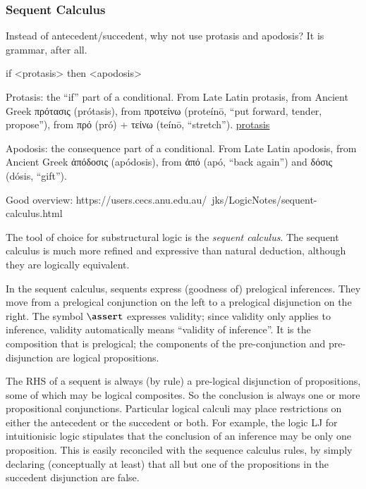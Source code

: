 \documentclass{article}
\begin{document}

\subsubsection{Sequent Calculus}

Instead of antecedent/succedent, why not use protasis and apodosis? It
is grammar, after all.

if <protasis> then <apodosis>

Protasis: the ``if'' part of a conditional. From Late Latin protasis,
from Ancient Greek πρότασις (prótasis), from προτείνω (proteínō, “put
forward, tender, propose”), from πρό (pró) + τείνω (teínō, “stretch”).
\href{https://en.wiktionary.org/wiki/protasis}{protasis}

Apodosis: the consequence part of a conditional. From Late Latin
apodosis, from Ancient Greek ἀπόδοσις (apódosis), from ἀπό (apó, “back
again”) and δόσις (dósis, “gift”).

Good overview:
https://users.cecs.anu.edu.au/~jks/LogicNotes/sequent-calculus.html


The tool of choice for substructural logic is the \textit{sequent
  calculus}. The sequent calculus is much more refined and expressive
than natural deduction, although they are logically equivalent.

In the sequent calculus, sequents express (goodness of) prelogical
inferences. They move from a prelogical conjunction on the left to a
prelogical disjunction on the right. The symbol \(\linfer\) expresses
validity; since validity only applies to inference, validity
automatically means ``validity of inference''. It is the composition
that is prelogical; the components of the pre-conjunction and
pre-disjunction are logical propositions.

The RHS of a sequent is always (by rule) a pre-logical disjunction of
propositions, some of which may be logical composites. So the
conclusion is always one or more propositional conjunctions.
Particular logical calculi may place restrictions on either the
antecedent or the succedent or both. For example, the logic LJ for
intuitionisic logic stipulates that the conclusion of an inference may
be only one proposition. This is easily reconciled with the sequence
calculus rules, by simply declaring (conceptually at least) that all
but one of the propositions in the succedent disjunction are false.
\end{document}
